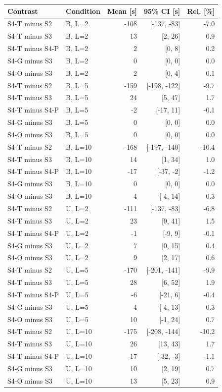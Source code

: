 \begin{tabular}{llrrr}\toprule
Contrast & Condition & Mean [s] & 95\% CI [s] & Rel. [\%]\\\midrule
S4-T minus S2 & B, L=2 & -108 & [-137, -83] & -7.0\\
S4-T minus S3 & B, L=2 & 13 & [2, 26] & 0.9\\
S4-T minus S4-P & B, L=2 & 2 & [0, 8] & 0.2\\
S4-G minus S3 & B, L=2 & 0 & [0, 0] & 0.0\\
S4-O minus S3 & B, L=2 & 2 & [0, 4] & 0.1\\
S4-T minus S2 & B, L=5 & -159 & [-198, -122] & -9.7\\
S4-T minus S3 & B, L=5 & 24 & [5, 47] & 1.7\\
S4-T minus S4-P & B, L=5 & -2 & [-17, 11] & -0.1\\
S4-G minus S3 & B, L=5 & 0 & [0, 0] & 0.0\\
S4-O minus S3 & B, L=5 & 0 & [0, 0] & 0.0\\
S4-T minus S2 & B, L=10 & -168 & [-197, -140] & -10.4\\
S4-T minus S3 & B, L=10 & 14 & [1, 34] & 1.0\\
S4-T minus S4-P & B, L=10 & -17 & [-37, -2] & -1.2\\
S4-G minus S3 & B, L=10 & 0 & [0, 0] & 0.0\\
S4-O minus S3 & B, L=10 & 4 & [-4, 14] & 0.3\\
S4-T minus S2 & U, L=2 & -111 & [-137, -83] & -6.8\\
S4-T minus S3 & U, L=2 & 23 & [9, 41] & 1.5\\
S4-T minus S4-P & U, L=2 & -1 & [-9, 9] & -0.1\\
S4-G minus S3 & U, L=2 & 7 & [0, 15] & 0.4\\
S4-O minus S3 & U, L=2 & 9 & [2, 17] & 0.6\\
S4-T minus S2 & U, L=5 & -170 & [-201, -141] & -9.9\\
S4-T minus S3 & U, L=5 & 28 & [6, 52] & 1.9\\
S4-T minus S4-P & U, L=5 & -6 & [-21, 6] & -0.4\\
S4-G minus S3 & U, L=5 & 4 & [-4, 13] & 0.3\\
S4-O minus S3 & U, L=5 & 10 & [-1, 24] & 0.7\\
S4-T minus S2 & U, L=10 & -175 & [-208, -144] & -10.2\\
S4-T minus S3 & U, L=10 & 26 & [13, 43] & 1.7\\
S4-T minus S4-P & U, L=10 & -17 & [-32, -3] & -1.1\\
S4-G minus S3 & U, L=10 & 10 & [2, 19] & 0.7\\
S4-O minus S3 & U, L=10 & 13 & [5, 23] & 0.9\\
\bottomrule\end{tabular}
